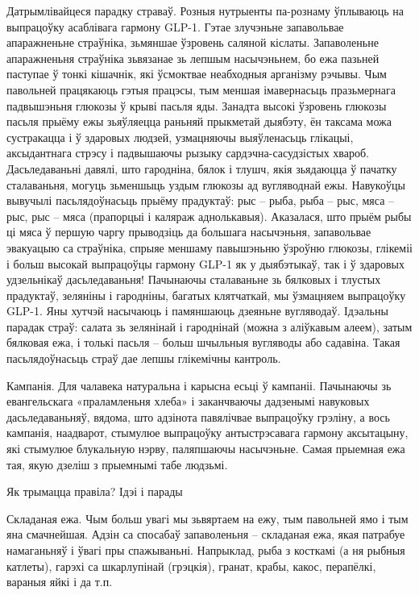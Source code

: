Датрымлівайцеся парадку страваў.
Розныя нутрыенты па-рознаму ўплываюць на выпрацоўку асаблівага гармону GLP-1. Гэтае злучэньне запавольвае апаражненьне страўніка, зьмяншае ўзровень саляной кіслаты. Запаволеньне апаражненьня страўніка зьвязанае зь лепшым насычэньнем, бо ежа пазьней паступае ў тонкі кішачнік, які ўсмоктвае неабходныя арганізму рэчывы. Чым павольней працякаюць гэтыя працэсы, тым меншая імавернасьць празьмернага падвышэньня глюкозы ў крыві пасьля яды. Занадта высокі ўзровень глюкозы пасьля прыёму ежы зьяўляецца раньняй прыкметай дыябэту, ён таксама можа сустракацца і ў здаровых людзей, узмацняючы выяўленасьць глікацыі, аксыдантнага стрэсу і падвышаючы рызыку сардэчна-сасудзістых хвароб. Дасьледаваньні давялі, што гародніна, бялок і тлушч, якія зьядаюцца ў пачатку сталаваньня, могуць зьменшыць уздым глюкозы ад вугляводнай ежы. Навукоўцы вывучылі пасьлядоўнасьць прыёму прадуктаў: рыс – рыба, рыба – рыс, мяса – рыс, рыс – мяса (прапорцыі і каляраж аднолькавыя).
Аказалася, што прыём рыбы ці мяса ў першую чаргу прыводзіць да большага насычэньня, запавольвае эвакуацыю са страўніка, спрыяе меншаму павышэньню ўзроўню глюкозы, глікеміі і больш высокай выпрацоўцы гармону GLP-1 як у дыябэтыкаў, так і ў здаровых удзельнікаў дасьледаваньня! Пачынаючы сталаваньне зь бялковых і тлустых прадуктаў, зеляніны і гародніны, багатых клятчаткай, мы ўзмацняем выпрацоўку GLP-1. Яны хутчэй насычаюць і памяншаюць дзеяньне вугляводаў. Ідэальны парадак страў: салата зь зелянінай і гароднінай (можна з аліўкавым алеем), затым бялковая ежа, і толькі пасьля – больш шчыльныя вугляводы або садавіна. Такая пасьлядоўнасьць страў дае лепшы глікемічны кантроль.

Кампанія.
Для чалавека натуральна і карысна есьці ў кампаніі. Пачынаючы зь евангельскага «праламленьня хлеба» і заканчваючы дадзенымі навуковых дасьледаваньняў, вядома, што адзінота павялічвае выпрацоўку грэліну, а вось кампанія, наадварот, стымулюе выпрацоўку антыстрэсавага гармону аксытацыну, які стымулюе блукальную нэрву, паляпшаючы насычэньне. Самая прыемная ежа тая, якую дзеліш з прыемнымі табе людзьмі.

Як трымацца правіла? Ідэі і парады

Складаная ежа.
Чым больш увагі мы зьвяртаем на ежу, тым павольней ямо і тым яна смачнейшая. Адзін са спосабаў запаволеньня – складаная ежа, якая патрабуе намаганьняў і ўвагі пры спажываньні. Напрыклад, рыба з косткамі (а ня рыбныя катлеты), гарэхі са шкарлупінай (грэцкія), гранат, крабы, какос, перапёлкі, вараныя яйкі і да т.п.

